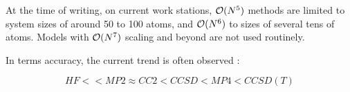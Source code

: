 At the time of writing, on current work stations, $\mathcal{O}(N^{5})$ methods are limited to system sizes of around 50 to 100 atoms, and $\mathcal{O}(N^{6})$ to sizes of several tens of atoms. Models with $\mathcal{O}(N^{7})$ scaling and beyond are not used routinely. 

In terms accuracy, the current trend is often observed \cite{Jen2017}:

\begin{equation}
HF << MP2 \approx CC2 < CCSD < MP4 < CCSD(T) 
\end{equation}


